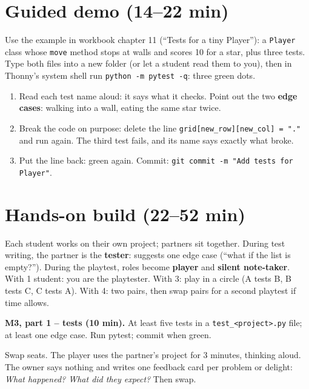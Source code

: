 \section{Guided demo (14--22 min)}
\begin{workedexample}
Use the example in workbook chapter 11 (\enquote{Tests for a tiny Player}): a \texttt{Player} class whose \texttt{move} method stops at walls and scores 10 for a star, plus three tests. Type both files into a new folder (or let a student read them to you), then in Thonny's system shell run \texttt{python -m pytest -q}: three green dots.
\begin{enumerate}[itemsep=1pt]
  \item Read each test name aloud: it says what it checks. Point out the two \textbf{edge cases}: walking into a wall, eating the same star twice.
  \item Break the code on purpose: delete the line \texttt{grid[new\_row][new\_col] = "."} and run again. The third test fails, and its name says exactly what broke.
  \item Put the line back: green again. Commit: \texttt{git commit -m "Add tests for Player"}.
\end{enumerate}
\end{workedexample}

\section{Hands-on build (22--52 min)}
\begin{pairroles}
Each student works on their own project; partners sit together. During test writing, the partner is the \textbf{tester}: suggests one edge case (\enquote{what if the list is empty?}). During the playtest, roles become \textbf{player} and \textbf{silent note-taker}. With 1 student: you are the playtester. With 3: play in a circle (A tests B, B tests C, C tests A). With 4: two pairs, then swap pairs for a second playtest if time allows.
\end{pairroles}

\textbf{M3, part 1 -- tests (10 min).} At least five tests in a \texttt{test\_<project>.py} file; at least one edge case. Run pytest; commit when green.

\begin{unplugged}
Swap seats. The player uses the partner's project for 3 minutes, thinking aloud. The owner says nothing and writes one feedback card per problem or delight: \emph{What happened? What did they expect?} Then swap.
\end{unplugged}

